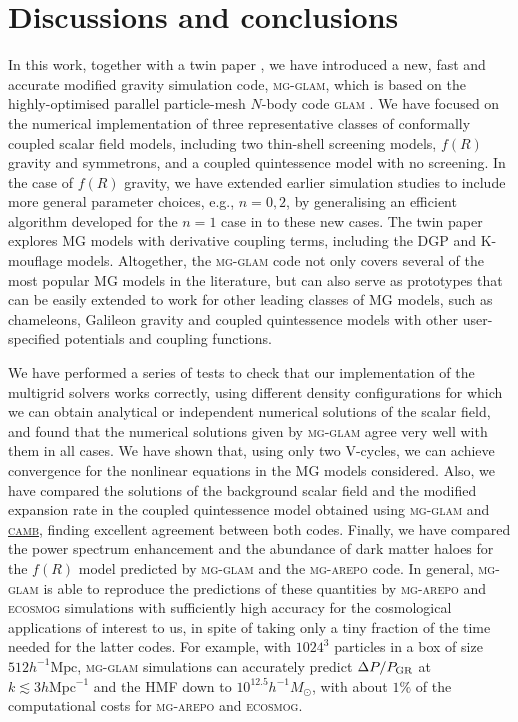 \section{Discussions and conclusions}
\label{sect:discuz}

In this work, together with a twin paper \citep{Hernandez-Aguayo:2021_twin_paper}, we have introduced a new, fast and accurate modified gravity simulation code, \textsc{mg-glam}, which is based on the highly-optimised parallel particle-mesh $N$-body code \textsc{glam} \citep{Klypin:2017iwu}.
We have focused on the numerical implementation of three representative classes of conformally coupled scalar field models, including two thin-shell screening models, $f(R)$ gravity and symmetrons, and a coupled quintessence model with no screening. In the case of $f(R)$ gravity, we have extended earlier simulation studies to include more general parameter choices, e.g., $n=0,2$, by generalising an efficient algorithm developed for the $n=1$ case in \cite{Bose:2016wms} to these new cases. The twin paper \citep{Hernandez-Aguayo:2021_twin_paper} explores \ac{MG} models with derivative coupling terms, including the {DGP} and K-mouflage models. Altogether, the \textsc{mg-glam} code not only covers several of the most popular \ac{MG} models in the literature, but can also serve as prototypes that can be %
easily extended to work for other leading classes of \ac{MG} models, such as chameleons, Galileon gravity and coupled quintessence models with other user-specified potentials and coupling functions.


We have performed a series of tests to check that our implementation of the multigrid solvers works correctly, using different density configurations for which we can obtain analytical or independent numerical solutions of the scalar field, and found that the numerical solutions given by \textsc{mg-glam} agree very well with them in all cases. We have shown that, using only two V-cycles, we can achieve convergence for the nonlinear equations in the \ac{MG} models considered. 
Also, we have compared the solutions of the background scalar field and the modified expansion rate in the coupled quintessence model obtained using \textsc{mg-glam} and \href{https://camb.info/}{\textsc{camb}}, finding excellent agreement between both codes. 
Finally, we have compared the power spectrum enhancement and the abundance of dark matter haloes for the $f(R)$ model predicted by \textsc{mg-glam} and the \textsc{mg-arepo} code. 
In general, \textsc{mg-glam} is able to reproduce the predictions of these quantities by \textsc{mg-arepo} and \textsc{ecosmog} simulations with sufficiently high accuracy for the cosmological applications of interest to us, in spite of taking only a tiny fraction of the time needed for the latter codes. For example, with $1024^3$ particles in a box of size $512h^{-1}\mathrm{Mpc}$, \textsc{mg-glam} simulations can accurately predict $\Delta P/P_{\rm GR}$ at $k\lesssim3h\mathrm{Mpc}^{-1}$ and the HMF down to $10^{12.5}h^{-1}M_\odot$, with about $1\%$ of the computational costs for \textsc{mg-arepo} and \textsc{ecosmog}. 

